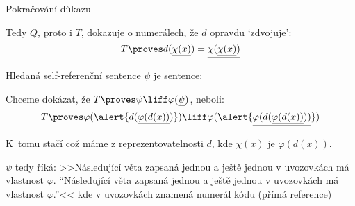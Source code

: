 \documentclass{beamer}
\begin{document}
\begin{frame}{Pokračování důkazu}

    \pause
    Tedy $Q$, proto i $T$, dokazuje \alert{o numerálech}, že $d$ opravdu `zdvojuje':
    $$
    T\proves d(\underline{\chi(x)})=\underline{\chi(\underline{\chi(x)})}
    $$
        
    \pause
    Hledaná self-referenční sentence $\psi$ je sentence:


    \bigskip

    \pause
    Chceme dokázat, že $T\proves \psi \liff \varphi(\underline{\psi})$, neboli:
    $$
    T \proves \varphi(\alert{d(\underline{\varphi(d(x))})})\liff\varphi(\alert{\underline{\varphi(d(\underline{\varphi(d(x))}))}})
    $$
    
    \pause
    K~tomu stačí  což máme z reprezentovatelnosti $d$, kde $\chi(x)$ je $\varphi(d(x))$.\hfill\qedsymbol

    \pause
    {\footnotesize
    $\psi$ tedy říká: >>Následující věta zapsaná jednou a ještě jednou v uvozovkách má vlastnost $\varphi$. ``Následující věta zapsaná jednou a ještě jednou v uvozovkách má vlastnost $\varphi$.''<< kde v uvozovkách znamená numerál kódu (přímá reference)
    }

\end{frame}
\end{document}
